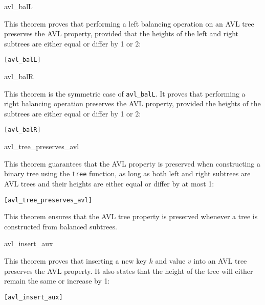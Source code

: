 \begin{thm}{avl\_balL}

This theorem proves that performing a left balancing operation on an AVL tree preserves the AVL property, provided that the heights of the left and right subtrees are either equal or differ by 1 or 2:


\begin{alltt}
	[avl_balL]
\end{alltt}


\end{thm}

\begin{thm}{avl\_balR}

This theorem is the symmetric case of \texttt{avl\_balL}. It proves that performing a right balancing operation preserves the AVL property, provided the heights of the subtrees are either equal or differ by 1 or 2:


\begin{alltt}
	[avl_balR]
\end{alltt}

\end{thm}

\begin{thm}{avl\_tree\_preserves\_avl}

This theorem guarantees that the AVL property is preserved when constructing a binary tree using the \texttt{tree} function, as long as both left and right subtrees are AVL trees and their heights are either equal or differ by at most 1:


\begin{alltt}
	[avl_tree_preserves_avl]
\end{alltt}
\end{thm}

This theorem ensures that the AVL tree property is preserved whenever a tree is constructed from balanced subtrees.

\begin{thm}{avl\_insert\_aux}

This theorem proves that inserting a new key \(k\) and value \(v\) into an AVL tree preserves the AVL property. It also states that the height of the tree will either remain the same or increase by 1:


\begin{alltt}
	[avl_insert_aux]
\end{alltt}

\end{thm}

